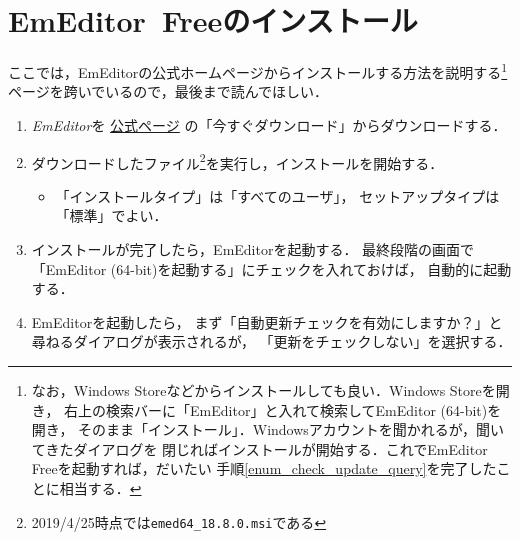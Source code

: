 \documentclass{ltjsarticle}
\begin{document}
\newpage
\section{EmEditor~Freeのインストール} \label{install_emeditor}

ここでは，EmEditorの公式ホームページからインストールする方法を説明する\footnote{
なお，Windows Storeなどからインストールしても良い．Windows Storeを開き，
右上の検索バーに「EmEditor」と入れて検索してEmEditor (64-bit)を開き，
そのまま「インストール」．Windowsアカウントを聞かれるが，聞いてきたダイアログを
閉じればインストールが開始する．これでEmEditor Freeを起動すれば，だいたい
手順\ref{enum_check_update_query}を完了したことに相当する．
}
ページを跨いでいるので，最後まで読んでほしい．

\begin{enumerate}
\item \emph{EmEditor}を
  \href{http://jp.emeditor.com/}{公式ページ}%
  の「今すぐダウンロード」からダウンロードする．%
\item ダウンロードしたファイル\footnote{2019/4/25時点では\texttt{emed64\_18.8.0.msi}である
}を実行し，インストールを開始する．
  \begin{itemize}
  \item 「インストールタイプ」は「すべてのユーザ」， セットアップタイプは「標準」でよい．%
  \end{itemize}

\item インストールが完了したら，EmEditorを起動する．
  最終段階の画面で「EmEditor (64-bit)を起動する」にチェックを入れておけば，
  自動的に起動する．

\item %
  EmEditorを起動したら，%
  まず「自動更新チェックを有効にしますか？」と尋ねるダイアログが表示されるが，
  「更新をチェックしない」を選択する．\label{enum_check_update_query}


\end{enumerate}
\end{document}
